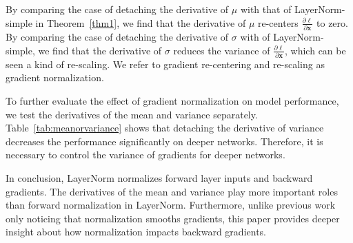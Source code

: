 \documentclass{article}
\newcommand*{\vect}[1]{\textbf{#1}}
\begin{document}
By comparing the case of detaching the derivative of $\mu$ with that of LayerNorm-simple in Theorem~\ref{thm1}, we find that the derivative of $\mu$ re-centers $\frac{\partial\ell}{\partial\vect{x}}$ to zero. 
By comparing the case of detaching the derivative of $\sigma$ with of LayerNorm-simple, we find that  the derivative of $\sigma$ reduces the variance of $\frac{\partial\ell}{\partial\vect{x}}$, which can be seen a kind of re-scaling.  We refer to gradient re-centering and re-scaling as gradient normalization.




To further evaluate the effect of gradient normalization on model performance, we test the derivatives of the mean and variance separately. Table~\ref{tab:meanorvariance} shows that detaching the derivative of variance decreases the performance significantly on deeper networks. Therefore, it is necessary to control the variance of gradients for deeper networks. 

In conclusion,  LayerNorm normalizes forward layer inputs and backward gradients. The derivatives of the mean and variance play more important roles than forward normalization in LayerNorm. Furthermore, unlike previous work~\citep{santurkar2018does} only noticing that normalization smooths gradients, this paper provides deeper insight about how normalization impacts backward gradients. 
\end{document}
